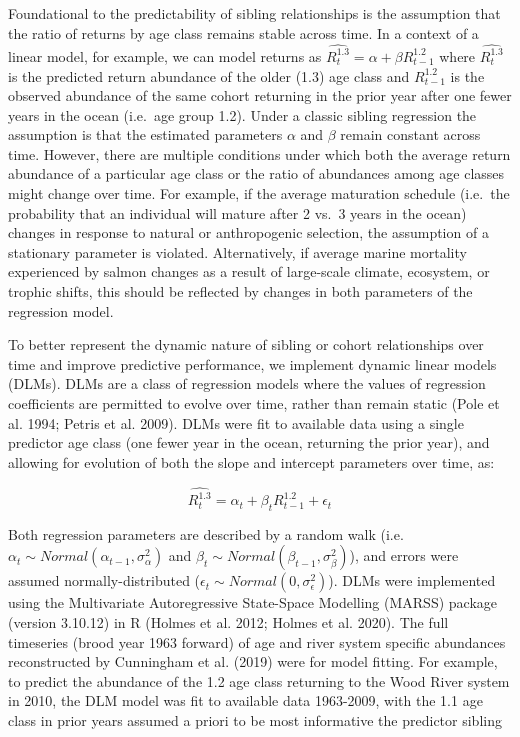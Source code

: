 \documentclass[
]{article}
\begin{document}
Foundational to the predictability of sibling relationships is the assumption that the ratio of returns by age class remains stable across time. In a context of a linear model, for example, we can model returns as \(\hat{R^{1.3}_t} = \alpha + \beta{R^{1.2}_{t-1}}\) where \(\hat{R^{1.3}_t}\) is the predicted return abundance of the older (1.3) age class and \(R^{1.2}_{t-1}\) is the observed abundance of the same cohort returning in the prior year after one fewer years in the ocean (i.e.~age group 1.2). Under a classic sibling regression the assumption is that the estimated parameters \(\alpha\) and \(\beta\) remain constant across time. However, there are multiple conditions under which both the average return abundance of a particular age class or the ratio of abundances among age classes might change over time. For example, if the average maturation schedule (i.e.~the probability that an individual will mature after 2 vs.~3 years in the ocean) changes in response to natural or anthropogenic selection, the assumption of a stationary parameter is violated. Alternatively, if average marine mortality experienced by salmon changes as a result of large-scale climate, ecosystem, or trophic shifts, this should be reflected by changes in both parameters of the regression model.

To better represent the dynamic nature of sibling or cohort relationships over time and improve predictive performance, we implement dynamic linear models (DLMs). DLMs are a class of regression models where the values of regression coefficients are permitted to evolve over time, rather than remain static (Pole et al. 1994; Petris et al. 2009). DLMs were fit to available data using a single predictor age class (one fewer year in the ocean, returning the prior year), and allowing for evolution of both the slope and intercept parameters over time, as:

\[\hat{R^{1.3}_t} = \alpha_t + \beta_t{R^{1.2}_{t-1}} + \epsilon_t\]

Both regression parameters are described by a random walk (i.e.~\(\alpha_t \sim Normal(\alpha_{t-1},\sigma^2_{\alpha})\) and \(\beta_t \sim Normal(\beta_{t-1},\sigma^2_{\beta})\)), and errors were assumed normally-distributed (\(\epsilon_t \sim Normal(0,\sigma^2_{\epsilon})\)). DLMs were implemented using the Multivariate Autoregressive State-Space Modelling (MARSS) package (version 3.10.12) in R (Holmes et al. 2012; Holmes et al. 2020). The full timeseries (brood year 1963 forward) of age and river system specific abundances reconstructed by Cunningham et al. (2019) were for model fitting. For example, to predict the abundance of the 1.2 age class returning to the Wood River system in 2010, the DLM model was fit to available data 1963-2009, with the 1.1 age class in prior years assumed a priori to be most informative the predictor sibling
\end{document}
